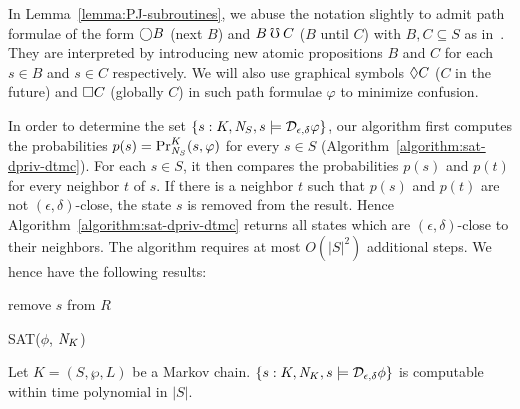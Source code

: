 In Lemma~\ref{lemma:PJ-subroutines}, we abuse the notation slightly to
admit path formulae of the form $\gX B$ (next $B$) and
$B \guntil C$ ($B$ until $C$) with $B, C \subseteq S$ as
in~\cite{BK:08:PMC}. They are interpreted by introducing new atomic
propositions $B$ and $C$ for each $s \in B$ and $s \in C$
respectively. We will also use graphical symbols $\gF C$ ($C$ in
the future) and $\gG C$ (globally $C$) in such path formulae
$\varphi$ to minimize confusion.

In order to determine the set $\{ s : K, \neighbor{S}, s \models
\dpriv{\epsilon}{\delta} \varphi \}$, our algorithm first computes
the probabilities $p (s) = \myPr{s}{K}{\neighbor{S}}{\varphi}$ for every
$s \in S$ (Algorithm~\ref{algorithm:sat-dpriv-dtmc}). For each $s \in S$,
it then compares the probabilities $p (s)$ and $p (t)$ for every
neighbor $t$ of $s$. If there is a neighbor $t$ such that $p (s)$ and
$p (t)$ are not $(\epsilon, \delta)$-close, the state $s$
is removed from the result. Hence
Algorithm~\ref{algorithm:sat-dpriv-dtmc} returns all states which are
$(\epsilon, \delta)$-close to their neighbors.
The algorithm requires at most $O
(|S|^2)$ additional steps. We hence have the following results:

\begin{algorithm}
  \begin{algorithmic}[1]
    \Match{$\phi$}
    \Case{$\X \Psi$}
    \EndCase
    \EndCase
    \EndMatch
        {remove $s$ from $R$}
        \EndIf
      \EndFor
    \EndFor

    \EndFunction
  \end{algorithmic}
  \caption{SAT($\phi$, $\neighbor{K}$)}
  \label{algorithm:sat-dpriv-dtmc}
\end{algorithm}

\begin{proposition}
  Let $K = (S, \wp, L)$ be a Markov chain.
  $\{ s : K, \neighbor{K}, s \models \dpriv{\epsilon}{\delta} \phi \}$ is
  computable within time polynomial in $|S|$.
\end{proposition}

